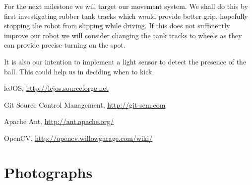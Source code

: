 \documentclass[12pt, a4paper, titlepage]{article}
\begin{document}
For the next milestone we will target our movement system. We shall do this
by first investigating rubber tank tracks which would provide better grip,
hopefully stopping the robot from slipping while driving. If this does not
sufficiently improve our robot we will consider changing the tank tracks to
wheels as they can provide precise turning on the spot.

It is also our intention to implement a light sensor to detect the presence of
the ball. This could help us in deciding when to kick.

\newpage

\setcounter{section}{5}
\begin{thebibliography}{9}

	leJOS,
	\url{http://lejos.sourceforge.net}

	Git Source Control Management,
	\url{http://git-scm.com}

	Apache Ant,
	\url{http://ant.apache.org/}

	OpenCV,
	\url{http://opencv.willowgarage.com/wiki/}

\end{thebibliography}

\appendix
\section{Photographs}
\end{document}

